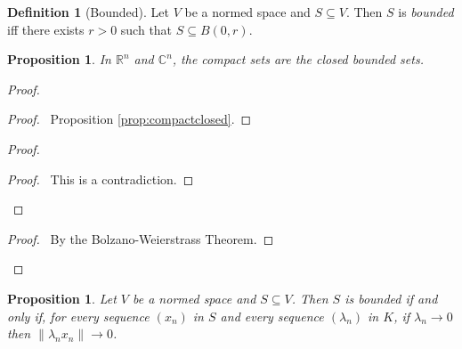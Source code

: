\documentclass{book}
\let\qed\relax
\newtheorem{prop}[ax]{Proposition}
\theoremstyle{definition}
\newtheorem{df}[ax]{Definition}
\begin{document}
\begin{df}[Bounded]
Let $V$ be a normed space and $S \subseteq V$. Then $S$ is \emph{bounded} iff there exists $r > 0$ such that $S \subseteq B(0,r)$.
\end{df}

\begin{prop}
In $\mathbb{R}^n$ and $\mathbb{C}^n$, the compact sets are the closed bounded sets.
\end{prop}

\begin{proof}
\pf
{}
\begin{proof}
	\pf\ Proposition \ref{prop:compactclosed}.
\end{proof}
\begin{proof}
	\qedstep
	\begin{proof}
		\pf\ This is a contradiction.
	\end{proof}
\end{proof}
\begin{proof}
	\pf\ By the Bolzano-Weierstrass Theorem.
\end{proof}
\qed
\end{proof}

\begin{prop}
Let $V$ be a normed space and $S \subseteq V$. Then $S$ is bounded if and only if, for every sequence $(x_n)$ in $S$ and every sequence $(\lambda_n)$ in $K$, if $\lambda_n \rightarrow 0$ then $\| \lambda_n x_n \| \rightarrow 0$.
\end{prop}
\end{document}
